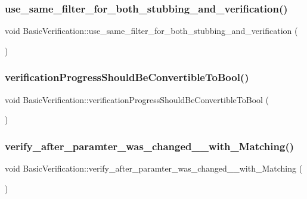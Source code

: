 \subsubsection{\texorpdfstring{use\_same\_filter\_for\_both\_stubbing\_and\_verification()}{use\_same\_filter\_for\_both\_stubbing\_and\_verification()}}
{\footnotesize\ttfamily void Basic\+Verification\+::use\+\_\+same\+\_\+filter\+\_\+for\+\_\+both\+\_\+stubbing\+\_\+and\+\_\+verification (\begin{DoxyParamCaption}{ }\end{DoxyParamCaption})\hspace{0.3cm}{\ttfamily [inline]}}

\mbox{\label{structBasicVerification_a5b169ea0842f3615e89d0d7e00423e46}} 
\subsubsection{\texorpdfstring{verificationProgressShouldBeConvertibleToBool()}{verificationProgressShouldBeConvertibleToBool()}}
{\footnotesize\ttfamily void Basic\+Verification\+::verification\+Progress\+Should\+Be\+Convertible\+To\+Bool (\begin{DoxyParamCaption}{ }\end{DoxyParamCaption})\hspace{0.3cm}{\ttfamily [inline]}}

\mbox{\label{structBasicVerification_a73bf0c64a1ccdab9aa653ace6874de38}} 
\subsubsection{\texorpdfstring{verify\_after\_paramter\_was\_changed\_\_with\_Matching()}{verify\_after\_paramter\_was\_changed\_\_with\_Matching()}}
{\footnotesize\ttfamily void Basic\+Verification\+::verify\+\_\+after\+\_\+paramter\+\_\+was\+\_\+changed\+\_\+\+\_\+with\+\_\+\+Matching (\begin{DoxyParamCaption}{ }\end{DoxyParamCaption})\hspace{0.3cm}{\ttfamily [inline]}}

